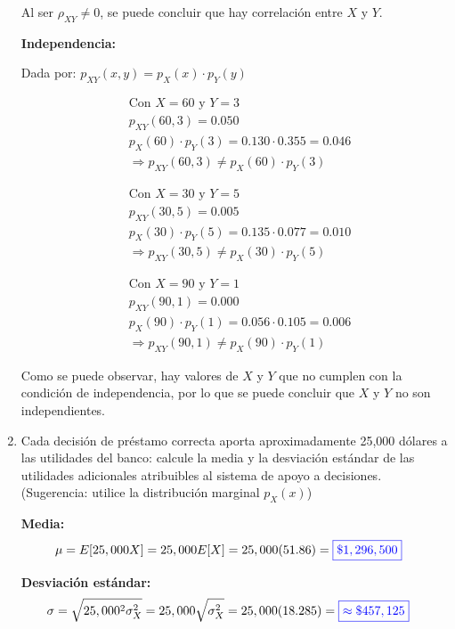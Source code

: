 \documentclass[12pt]{report}
\newcommand{\linejump}{\hfill \break}
\begin{document}
\begin{enumerate}
    Al ser $\rho_{XY} \neq 0$, se puede concluir que {\color{blue}hay correlación} entre $X$ y $Y$.

    \linejump
    \textbf{Independencia:}

    Dada por: $p_{XY}(x, y) = p_X(x) \cdot p_Y(y)$
    
    \begin{align*}
      &\text{Con } X = 60 \text{ y } Y = 3 \\
      &p_{XY}(60, 3) = 0.050 \\
      &p_X(60) \cdot p_Y(3) = 0.130 \cdot 0.355 = 0.046 \\
      &\Rightarrow p_{XY}(60, 3) \neq p_X(60) \cdot p_Y(3)
    \end{align*}

    \begin{align*}
      &\text{Con } X = 30 \text{ y } Y = 5 \\
      &p_{XY}(30, 5) = 0.005 \\
      &p_X(30) \cdot p_Y(5) = 0.135 \cdot 0.077 = 0.010 \\
      &\Rightarrow p_{XY}(30, 5) \neq p_X(30) \cdot p_Y(5)
    \end{align*}

    \begin{align*}
      &\text{Con } X = 90 \text{ y } Y = 1 \\
      &p_{XY}(90, 1) = 0.000 \\
      &p_X(90) \cdot p_Y(1) = 0.056 \cdot 0.105 = 0.006 \\
      &\Rightarrow p_{XY}(90, 1) \neq p_X(90) \cdot p_Y(1)
    \end{align*}

    Como se puede observar, hay valores de $X$ y $Y$ que no cumplen con la condición de independencia, por lo que se puede concluir que $X$ y $Y$ {\color{blue}no son independientes.} \\

    \item Cada decisión de préstamo correcta aporta aproximadamente 25,000 dólares a las utilidades del banco: calcule la media y la desviación estándar de las utilidades adicionales atribuibles al sistema de apoyo a decisiones. (Sugerencia: utilice la distribución marginal $p_X(x)$)
    
    \textbf{Media:}
    \begin{align*}
      \mu = E[25,000X] &= 25,000E[X] = 25,000(51.86) = {\color{blue}\boxed{\$1,296,500}}
    \end{align*}

    \linejump
    \textbf{Desviación estándar:}
    \begin{align*}
      \sigma = \sqrt{25,000^2 \sigma_X^2} &= 25,000\sqrt{\sigma_X^2} = 25,000(18.285) = {\color{blue}\boxed{\approx \$457,125}}
    \end{align*}
  \end{enumerate}
\end{document}
